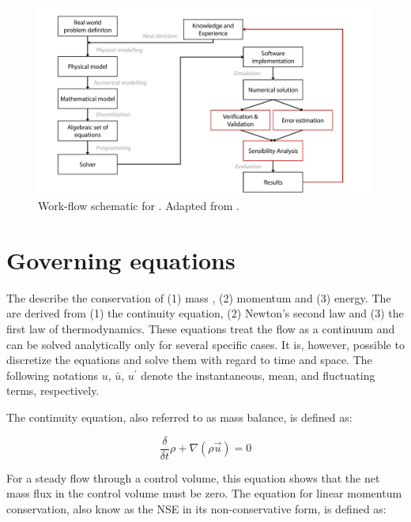 \begin{figure}[htb]
	\includegraphics[width=1\linewidth, trim=1.1cm 0cm 1.1cm 0, clip]{images/cfd_schematic}
	\caption[Work-flow schematic for \CFD]{Work-flow schematic for \CFD. Adapted from \citep{Giglmaier2016}.}
	\label{fig:schema_cfd}
\end{figure}



%
%

\clearpage
\section{Governing equations}
\label{sec:CFD:governing_equations}

The  describe the conservation of (1) mass , (2) momentum  and (3) energy.
The  are derived from (1) the continuity equation, (2) Newton's second law and (3) the first law of thermodynamics. 
These equations treat the flow as a continuum and can be solved analytically only for several specific cases.
It is, however, possible to discretize the equations and solve them with regard to time and space.
The following notations $u$, $\bar{u}$, $u^{\prime}$ denote the instantaneous, mean, and fluctuating terms, respectively.

The continuity equation, also referred to as mass balance, is defined as:

\begin{equation}
\frac{\delta }{\delta t}\rho +\nabla (\rho \vec{u})= 0
\label{eq:theory:continuity}
\end{equation}

For a steady flow through a control volume, this equation shows that the net mass flux in the control volume must be zero.
The equation for linear momentum conservation, also know as the \gls{NSE} in its non-conservative form, is defined as:

